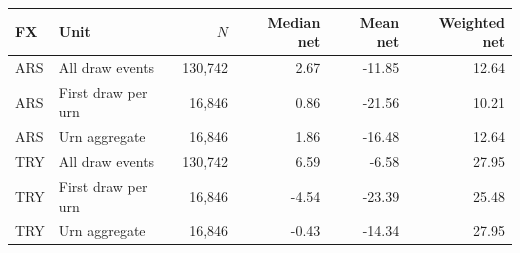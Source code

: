\begin{tabular}{llrrrr}
\toprule
FX & Unit & $N$ & Median net & Mean net & Weighted net \\
\midrule
ARS & All draw events & 130,742 & 2.67 & -11.85 & 12.64 \\
ARS & First draw per urn & 16,846 & 0.86 & -21.56 & 10.21 \\
ARS & Urn aggregate & 16,846 & 1.86 & -16.48 & 12.64 \\
TRY & All draw events & 130,742 & 6.59 & -6.58 & 27.95 \\
TRY & First draw per urn & 16,846 & -4.54 & -23.39 & 25.48 \\
TRY & Urn aggregate & 16,846 & -0.43 & -14.34 & 27.95 \\
\bottomrule
\end{tabular}
